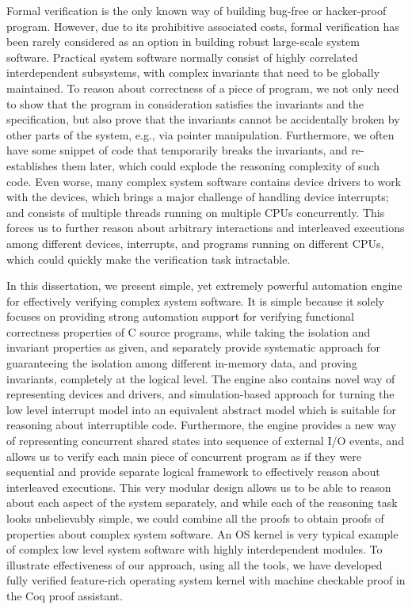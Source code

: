 Formal verification is the only known way of building bug-free or hacker-proof
program. However, due to its prohibitive associated costs, formal verification
has been rarely considered as an option in building robust large-scale system software.
Practical system software normally consist of highly correlated interdependent subsystems,
with complex invariants that need to be globally maintained. To reason about correctness of
a piece of program, we not only need to show that the program in consideration
satisfies the invariants and the specification, but also prove that the invariants cannot be
accidentally broken by other parts of the system, e.g., via pointer manipulation.
Furthermore, we often have some snippet of code that temporarily breaks the invariants,
and re-establishes them later, which could explode the reasoning complexity of such code.
Even worse, many complex system software contains device drivers to work with the devices,
which brings a major challenge of handling device interrupts;
and consists of multiple threads running on multiple CPUs concurrently. 
This forces us to further reason about arbitrary interactions and interleaved executions among
different devices, interrupts, and programs running on different CPUs, which could quickly make the verification
task intractable.

In this dissertation, we present simple, yet extremely powerful automation engine for effectively
verifying complex system software. It is simple because it solely focuses on providing strong automation
support for verifying functional correctness properties of C source programs, while taking the
isolation and invariant properties as given, and separately provide systematic approach
for guaranteeing the isolation among different in-memory data, and proving invariants, completely
at the logical level. The engine also contains novel way of representing devices and drivers, and
simulation-based approach for turning the low level interrupt model into an equivalent abstract model which is
suitable for reasoning about interruptible code. Furthermore, the engine provides a new way of representing
concurrent shared states into sequence of external I/O events, and allows us to verify each main piece of
concurrent program as if they were sequential and provide separate logical framework to effectively
reason about interleaved executions. This very modular design allows us to be able to reason about each
aspect of the system separately, and while each of the reasoning task looks unbelievably simple, we could combine
all the proofs to obtain proofs of properties about complex system software.
An OS kernel is very typical example of complex low level system software with highly interdependent modules.
To illustrate effectiveness of our approach, using all the tools, we have developed fully verified feature-rich
operating system kernel with machine checkable proof in the Coq proof assistant.



